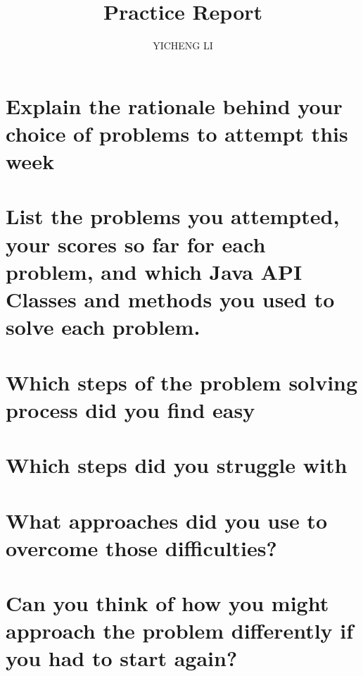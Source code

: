 \documentclass{article}
\author{YICHENG LI}
\title{Practice Report}
\begin{document}
\maketitle
\section{Explain the rationale behind your choice of problems to attempt 
this week}
\section{List the problems you attempted, your scores so far for each 
problem, and which Java API Classes and methods you used to 
solve each problem.} 
\section{Which steps of the problem solving process did you find easy}
\section{Which steps did you struggle with}
\section{What approaches did you use
to overcome those difficulties?}
\section{Can you think of how you might approach the problem differently 
if you had to start again?}
\end{document}

